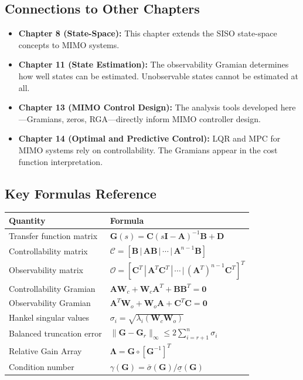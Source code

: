 \subsection{Connections to Other Chapters}

\begin{itemize}
\item \textbf{Chapter 8 (State-Space):} This chapter extends the SISO state-space concepts to MIMO systems.

\item \textbf{Chapter 11 (State Estimation):} The observability Gramian determines how well states can be estimated. Unobservable states cannot be estimated at all.

\item \textbf{Chapter 13 (MIMO Control Design):} The analysis tools developed here---Gramians, zeros, RGA---directly inform MIMO controller design.

\item \textbf{Chapter 14 (Optimal and Predictive Control):} LQR and MPC for MIMO systems rely on controllability. The Gramians appear in the cost function interpretation.
\end{itemize}

\subsection{Key Formulas Reference}

\begin{center}
\begin{tabular}{ll}
\toprule
\textbf{Quantity} & \textbf{Formula} \\
\midrule
Transfer function matrix & $\mathbf{G}(s) = \mathbf{C}(s\mathbf{I} - \mathbf{A})^{-1}\mathbf{B} + \mathbf{D}$ \\
Controllability matrix & $\mathcal{C} = [\mathbf{B} \,|\, \mathbf{A}\mathbf{B} \,|\, \cdots \,|\, \mathbf{A}^{n-1}\mathbf{B}]$ \\
Observability matrix & $\mathcal{O} = [\mathbf{C}^T \,|\, \mathbf{A}^T\mathbf{C}^T \,|\, \cdots \,|\, (\mathbf{A}^T)^{n-1}\mathbf{C}^T]^T$ \\
Controllability Gramian & $\mathbf{A}\mathbf{W}_c + \mathbf{W}_c\mathbf{A}^T + \mathbf{B}\mathbf{B}^T = \mathbf{0}$ \\
Observability Gramian & $\mathbf{A}^T\mathbf{W}_o + \mathbf{W}_o\mathbf{A} + \mathbf{C}^T\mathbf{C} = \mathbf{0}$ \\
Hankel singular values & $\sigma_i = \sqrt{\lambda_i(\mathbf{W}_c\mathbf{W}_o)}$ \\
Balanced truncation error & $\|\mathbf{G} - \mathbf{G}_r\|_\infty \leq 2\sum_{i=r+1}^n \sigma_i$ \\
Relative Gain Array & $\boldsymbol{\Lambda} = \mathbf{G} \circ [\mathbf{G}^{-1}]^T$ \\
Condition number & $\gamma(\mathbf{G}) = \bar{\sigma}(\mathbf{G})/\underline{\sigma}(\mathbf{G})$ \\
\bottomrule
\end{tabular}
\end{center}

